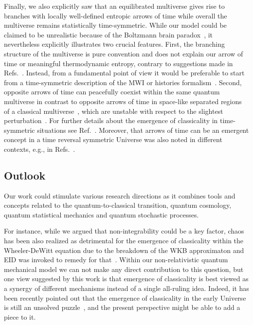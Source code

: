 \documentclass[pre,onecolumn,12pt,aps,longbibliography,nofootinbib]{revtex4-2}
\newcommand{\blue}[1]{#1}
\begin{document}
\blue{Finally, we also explicitly saw that an equilibrated multiverse gives rise to branches with locally well-defined entropic arrows of time while overall the multiverse remains statistically time-symmetric. While our model could be claimed to be unrealistic because of the Boltzmann brain paradox~\cite{AlbrechtSorboPRD2004, CarrollInBook2020, MuellerQuantum2020}, it nevertheless explicitly illustrates two crucial features. First, the branching structure of the multiverse is pure convention and does not explain our arrow of time or meaningful thermodynamic entropy, contrary to suggestions made in Refs.~\cite{DeutschInBook2010, Aaronson2013}. Instead, from a fundamental point of view it would be preferable to start from a time-symmetric description of the MWI or histories formalism~\cite{AharonovBergmannLebowitzPR1964, IshamJMP1994, IshamLindenPRA1997, GriffithsBook2002, VaidmanInBook2010}. Second, opposite arrows of time can peacefully coexist within the same quantum multiverse in contrast to opposite arrows of time in space-like separated regions of a classical multiverse~\cite{SchulmanPRL1999}, which are unstable with respect to the slightest perturbation~\cite{KupervasserNikolicZlaticFP2012}. For further details about the emergence of classicality in time-symmetric situations see Ref.~\cite{AlbrechtBaunachArrasmithPRD2022}. Moreover, that arrows of time can be an emergent concept in a time reversal symmetric Universe was also noted in different contexts, e.g., in Refs.~\cite{SchulmanPRL1999, CarrollChenArXiv2004, BarbourKoslowskiMercatiPRL2014, DeutschAguirreFP2022}.}

\subsection{\blue{Outlook}}

\blue{Our work could stimulate various research directions as it combines tools and concepts related to the quantum-to-classical transition, quantum cosmology, quantum statistical mechanics and quantum stochastic processes.}

\blue{For instance, while we argued that non-integrability could be a key factor,} chaos has been also realized as detrimental for the emergence of classicality within the Wheeler-DeWitt equation due to the breakdown of the WKB approximaton and EID was invoked to remedy for that~\cite{CalzettaGonzalezPRD1995, CornishShellardPRL1998, CalzettaCQG2012}. Within our non-relativistic quantum mechanical model we can not make any direct contribution to this question, but one view suggested by this work is that emergence of classicality is best viewed as a {synergy} of different mechanisms instead of a single all-ruling idea. Indeed, it has been recently pointed out that the emergence of classicality in the early Universe is still an unsolved puzzle~\cite{BerjonOkonSudarskyPRD2021}, and the present perspective might be able to add a piece to it.
\end{document}
